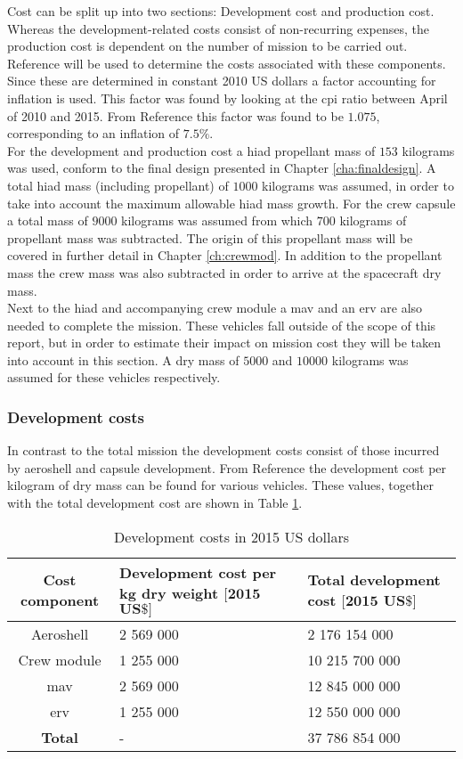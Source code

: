 Cost can be split up into two sections: Development cost and production cost. Whereas the development-related costs consist of non-recurring expenses, the production cost is dependent on the number of mission to be carried out. Reference \cite{Wertz2011} will be used to determine the costs associated with these components. Since these are determined in constant 2010 US dollars a factor accounting for inflation is used. This factor was found by looking at the \gls{cpi} ratio between April of 2010 and 2015. From Reference \cite{Crawford2015} this factor was found to be $1.075$, corresponding to an inflation of $7.5\%$.\\
For the development and production cost a \gls{hiad} propellant mass of $153$ kilograms was used, conform to the final design presented in Chapter \ref{cha:finaldesign}. A total \gls{hiad} mass (including propellant) of $1000$ kilograms was assumed, in order to take into account the maximum allowable \gls{hiad} mass growth. For the crew capsule a total mass of $9000$ kilograms was assumed from which $700$ kilograms of propellant mass was subtracted. The origin of this propellant mass will be covered in further detail in Chapter \ref{ch:crewmod}. In addition to the propellant mass the crew mass was also subtracted in order to arrive at the spacecraft dry mass.\\
Next to the \gls{hiad} and accompanying crew module a \acrlong{mav} and an \acrlong{erv} are also needed to complete the mission. These vehicles fall outside of the scope of this report, but in order to estimate their impact on mission cost they will be taken into account in this section. A dry mass of $5000$ and $10000$ kilograms was assumed for these vehicles respectively.

\subsubsection{Development costs}
In contrast to the total mission the development costs consist of those incurred by aeroshell and capsule development. From Reference \cite{Wertz2011} the development cost per kilogram of dry mass can be found for various vehicles. These values, together with the total development cost are shown in Table \ref{tab:devcosts}.

\begin{table}
	\centering
	\caption{Development costs in 2015 US dollars}
	\begin{tabular}{|c|p{5cm}|p{5cm}|}
		\hline
		\textbf{Cost component} & \textbf{Development cost per kg dry weight $\mathbf{[2015}$ $\mathbf{US\$]}$} & \textbf{Total development cost $\mathbf{[2015}$ $\mathbf{US\$]}$} \\ \hline \hline
		Aeroshell & 2 569 000 & 2 176 154 000 \\
		Crew module & 1 255 000 & 10 215 700 000 \\
		\acrlong{mav} & 2 569 000 & 12 845 000 000 \\
		\acrlong{erv} & 1 255 000 & 12 550 000 000 \\ \hline
		\textbf{Total} & - & 37 786 854 000 \\
		\hline
	\end{tabular}
	\label{tab:devcosts}
\end{table}

